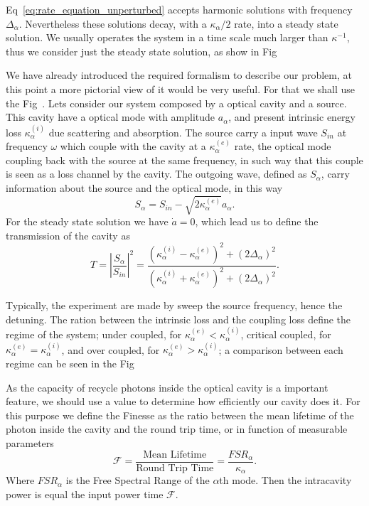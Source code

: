 Eq~\ref{eq:rate_equation_unperturbed} accepts harmonic solutions with frequency $\Delta_\alpha$. Nevertheless these solutions decay, with a  $\kappa_\alpha/2$ rate, into a steady state solution. We usually operates the system in a time scale much larger than $\kappa^{-1}$, thus we consider just the steady state solution, as show in Fig~

We have already introduced the required formalism to describe our problem, at this point a more pictorial view of it would be very useful. For that we shall use the Fig~. Lets consider our system composed by a optical cavity and a source. This cavity have a optical mode with amplitude $a_\alpha$, and present intrinsic energy loss $\kappa_\alpha^{(i)}$ due scattering and absorption. The source carry a input wave $S_{in}$ at frequency $\omega$ which couple with the cavity at a $\kappa_\alpha^{(e)}$ rate, the optical mode coupling back with the source at the same frequency, in such way that this couple is seen as a loss channel by the cavity. The outgoing wave, defined as $S_\alpha$, carry information about the source and the optical mode, in this way
\begin{equation}
    S_\alpha = S_{in} - \sqrt{2 \kappa_\alpha^{(e)}}a_\alpha.
\end{equation}
For the steady state solution we have $\dot{a} = 0$, which lead us to define the transmission of the cavity as
\begin{equation}
    T = \left|\frac{S_\alpha}{S_{in}}\right|^2 = \frac{\left(\kappa_\alpha^{(i)} -\kappa_\alpha^{(e)}\right)^2 + (2\Delta_\alpha)^2}{\left(\kappa_\alpha^{(i)} +\kappa_\alpha^{(e)}\right)^2 + (2\Delta_\alpha)^2}.
    \label{eq:single_mode_transmission}
\end{equation}

Typically, the experiment are made by sweep the source frequency, hence the detuning. The ration between the intrinsic loss and the coupling loss define the regime of the system; under coupled, for $\kappa_\alpha^{(e)} < \kappa_\alpha^{(i)}$, critical coupled, for $\kappa_\alpha^{(e)} = \kappa_\alpha^{(i)}$, and over coupled, for $\kappa_\alpha^{(e)} > \kappa_\alpha^{(i)}$; a comparison between each regime can be seen in the Fig~ 

As the capacity of recycle photons inside the optical cavity is a important feature, we should use a value to determine how efficiently our cavity does it. For this purpose we define the Finesse as the ratio between the mean lifetime of the photon inside the cavity and the round trip time, or in function of measurable parameters 
\begin{equation}
    \mathcal{F} = \frac{\text{Mean Lifetime}}{\text{Round Trip Time}} = \frac{FSR_\alpha}{\kappa_\alpha}.
    \label{eq:finesse}
\end{equation}
Where $FSR_\alpha$ is the Free Spectral Range of the $\alpha$th mode. Then the intracavity power is equal the input power time $\mathcal{F}$.

